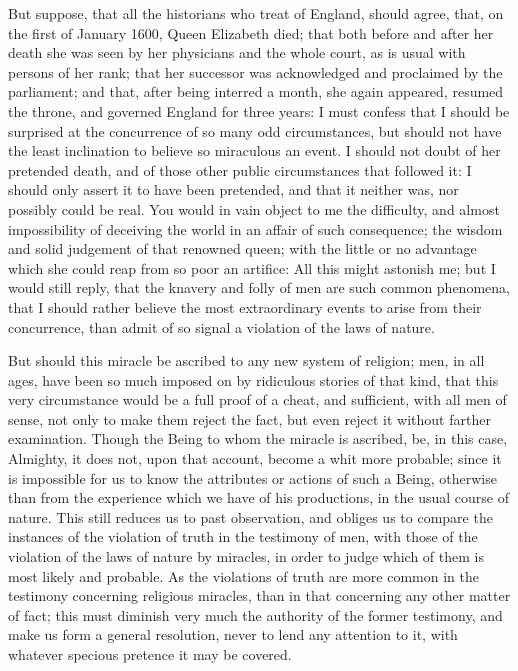 \documentclass[]{article}
\begin{document}
\begin{sectionbody}
\humeparagraph  But suppose, that all the historians who treat of England, should agree, that, on the first of January 1600, Queen Elizabeth died; that both before and after her death she was seen by her physicians and the whole court, as is usual with persons of her rank; that her successor was acknowledged and proclaimed by the parliament; and that, after being interred a month, she again appeared, resumed the throne, and governed England for three years: I must confess that I should be surprised at the concurrence of so many odd circumstances, but should not have the least inclination to believe so miraculous an event. I should not doubt of her pretended death, and of those other public circumstances that followed it: I should only assert it to have been pretended, and that it neither was, nor possibly could be real. You would in vain object to me the difficulty, and almost impossibility of deceiving the world in an affair of such consequence; the wisdom and solid judgement of that renowned queen; with the little or no advantage which she could reap from so poor an artifice: All this might astonish me; but I would still reply, that the knavery and folly of men are such common phenomena, that I should rather believe the most extraordinary events to arise from their concurrence, than admit of so signal a violation of the laws of nature.

\humeparagraph  But should this miracle be ascribed to any new system of religion; men, in all ages, have been so much imposed on by ridiculous stories of that kind, that this very circumstance would be a full proof of a cheat, and sufficient, with all men of sense, not only to make them reject the fact, but even reject it without farther examination. Though the Being to whom the miracle is ascribed, be, in this case, Almighty, it does not, upon that account, become a whit more probable; since it is impossible for us to know the attributes or actions of such a Being, otherwise than from the experience which we have of his productions, in the usual course of nature. This still reduces us to past observation, and obliges us to compare the instances of the violation of truth in the testimony of men, with those of the violation of the laws of nature by miracles, in order to judge which of them is most likely and probable. As the violations of truth are more common in the testimony concerning religious miracles, than in that concerning any other matter of fact; this must diminish very much the authority of the former testimony, and make us form a general resolution, never to lend any attention to it, with whatever specious pretence it may be covered.


\end{sectionbody}
\end{document}
